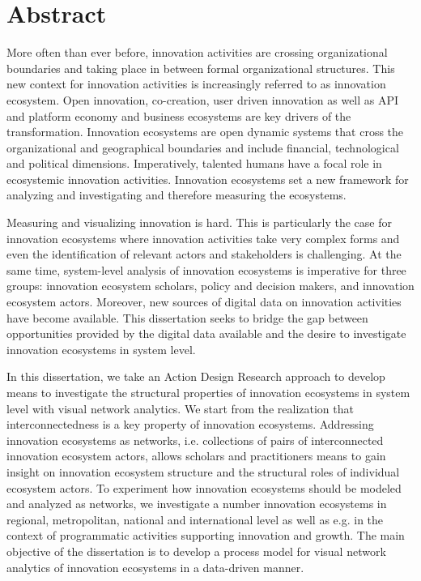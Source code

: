 \chapter{Abstract}
\label{chapter:abstract}


More often than ever before, innovation activities are crossing organizational boundaries and taking place in between formal organizational structures. This new context for innovation activities is increasingly referred to as innovation ecosystem. Open innovation, co-creation, user driven innovation as well as API and platform economy and business ecosystems are key drivers of the transformation. Innovation ecosystems are open dynamic systems that cross the organizational and geographical boundaries and include financial, technological and political dimensions. Imperatively, talented humans have a focal role in ecosystemic innovation activities. Innovation ecosystems set a new framework for analyzing and investigating and therefore measuring the ecosystems.

Measuring and visualizing innovation is hard. This is particularly the case for innovation ecosystems where innovation activities take very complex forms and even the identification of relevant actors and stakeholders is challenging. At the same time, system-level analysis of innovation ecosystems is imperative for three groups: innovation ecosystem scholars, policy and decision makers, and innovation ecosystem actors. Moreover, new sources of digital data on innovation activities have become available. This dissertation seeks to bridge the gap between opportunities provided by the digital data available and the desire to investigate innovation ecosystems in system level.

In this dissertation, we take an Action Design Research approach to develop means to investigate the structural properties of innovation ecosystems in system level with visual network analytics. We start from the realization that interconnectedness is a key property of innovation ecosystems. Addressing innovation ecosystems as networks, i.e. collections of pairs of interconnected innovation ecosystem actors, allows scholars and practitioners means to gain insight on innovation ecosystem structure and the structural roles of individual ecosystem actors. To experiment how innovation ecosystems should be modeled and analyzed as networks, we investigate a number innovation ecosystems in regional, metropolitan, national and international level as well as e.g. in the context of programmatic activities supporting innovation and growth. The main objective of the dissertation is to develop a process model for visual network analytics of innovation ecosystems in a data-driven manner. 

